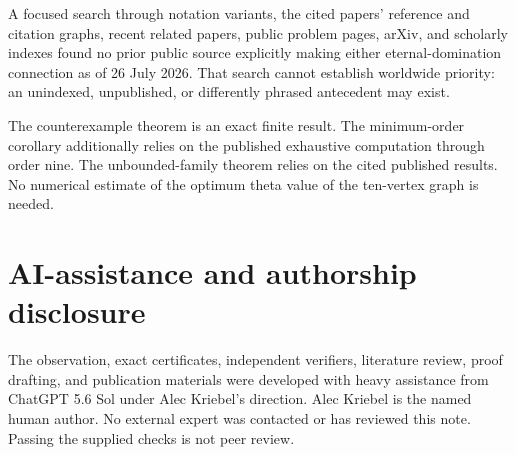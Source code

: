\documentclass[11pt]{article}
\begin{document}
A focused search through notation variants, the cited papers' reference and
citation graphs, recent related papers, public problem pages, arXiv, and
scholarly indexes found no prior public source explicitly making either
eternal-domination connection as of 26 July 2026.  That search cannot
establish worldwide priority: an unindexed, unpublished, or differently
phrased antecedent may exist.

The counterexample theorem is an exact finite result.  The minimum-order
corollary additionally relies on the published exhaustive computation through
order nine.  The unbounded-family theorem relies on the cited published
results.  No numerical estimate of the optimum theta value of the ten-vertex
graph is needed.

\section*{AI-assistance and authorship disclosure}

The observation, exact certificates, independent verifiers, literature
review, proof drafting, and publication materials were developed with heavy
assistance from ChatGPT 5.6 Sol under Alec Kriebel's direction.  Alec Kriebel
is the named human author.  No external expert was contacted or has reviewed
this note.  Passing the supplied checks is not peer review.
\end{document}
